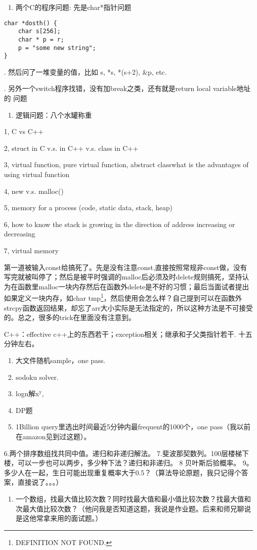 \documentclass[12pt]{book}
\begin{document}
\begin{enumerate}
\item 两个C的程序问题: 先是char*指针问题
\end{enumerate}
\lstset{language=java,label= ,caption= ,numbers=none}
\begin{lstlisting}
char *dosth() {
    char s[256];
    char * p = r;
    p = "some new string";
}
\end{lstlisting}

. 然后问了一堆变量的值，比如 s, *s, *(s+2), \&p, etc.

. 另外一个switch程序找错，没有加break之类，还有就是return local variable地址的
问题

\begin{enumerate}
\item 逻辑问题：八个水罐称重
\end{enumerate}

1, C vs C++

2, struct in C v.s. in C++ v.s. class in C++

3, virtual function, pure virtual function, abstract classwhat is the advantages of using virtual function

4, new v.s. malloc()

5, memory for a process (code, static data, stack, heap)

6, how to know the stack is growing in the direction of address increasing 
or decreasing

7, virtual memory

第一道被输入const给搞死了。先是没有注意const,直接按照常规非const做，没有写完就被叫停了；然后是被平时强调的malloc后必须及时delete规则搞死，坚持认为在函数里malloc一块内存然后在函数外delete是不好的习惯；最后当面试者提出如果定义一块内存，如char tmp\footnote{DEFINITION NOT FOUND.}，然后使用会怎么样？自己提到可以在函数外strcpy函数返回结果，却忘了arr大小实际是无法指定的，所以这种方法是不可接受的。总之，很多的trick在里面没有注意到。

C++：effective c++上的东西若干；exception相关；继承和子父类指针若干. 十五分钟左右。
\begin{enumerate}
\item 大文件随机sample，one pass.
\item sodoku solver.
\item logn解x$^{\text{y}}$,
\item DP题
\item 1Billion query里选出时间最近5分钟内最frequent的1000个，one pass（我以前在amazon见到过这题）。
\end{enumerate}
6.两个排序数组找共同中值。递归和非递归解法。
7.斐波那契数列。100层楼梯下楼，可以一步也可以两步，多少种下法？递归和非递归。 
8 贝叶斯后验概率。
9。多少人在一起，生日可能出现重复概率大于0.5？（算法导论原题，我只记得个答案，直接说了。。。）
\begin{enumerate}
\item 一个数组，找最大值比较次数？同时找最大值和最小值比较次数？找最大值和次最大值比较次数？（他问我是否知道这题，我说是作业题。后来和师兄聊说是这他常拿来用的面试题。）
\end{enumerate}
\end{document}
